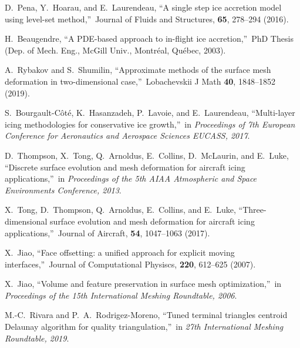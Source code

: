 \documentclass[
11pt,%
tightenlines,%
twoside,%
onecolumn,%
nofloats,%
nobibnotes,%
nofootinbib,%
superscriptaddress,%
noshowpacs,%
centertags]%
{revtex4-2}
\begin{document}
\begin{thebibliography}{99}
D.~Pena, Y.~Hoarau, and E.~Laurendeau, \textquotedblleft A single step ice accretion model using level-set method,\textquotedblright \ Journal of Fluids and Structures, {\bf 65}, 278--294 (2016).



H.~Beaugendre, \textquotedblleft A PDE-based approach to in-flight ice accretion,\textquotedblright \ PhD Thesis (Dep. of Mech. Eng., McGill Univ., Montr\'eal, Qu\'ebec, 2003).

A.~Rybakov and S.~Shumilin, \textquotedblleft Approximate methods of the surface mesh deformation in two-dimensional case,\textquotedblright \ Lobachevskii J Math {\bf 40}, 1848--1852 (2019).

S.~Bourgault-C\^ot\'e, K.~Hasanzadeh, P.~Lavoie, and E.~Laurendeau, \textquotedblleft Multi-layer icing methodologies for conservative ice growth,\textquotedblright \ in \textit{Proceedings of 7th European Conference for Aeronautics and Aerospace Sciences EUCASS, 2017}.

D.~Thompson, X.~Tong, Q.~Arnoldus, E.~Collins, D.~McLaurin, and E.~Luke, \textquotedblleft Discrete surface evolution and mesh deformation for aircraft icing applications,\textquotedblright \ in \textit{Proceedings of the 5th AIAA Atmospheric and Space Environments Conference, 2013}.

X.~Tong, D.~Thompson, Q.~Arnoldus, E.~Collins, and E.~Luke, \textquotedblleft Three-dimensional surface evolution and mesh deformation for aircraft icing applications,\textquotedblright \ Journal of Aircraft, {\bf 54}, 1047--1063 (2017).

X.~Jiao, \textquotedblleft Face offsetting: a unified approach for explicit moving interfaces,\textquotedblright \ Journal of Computational Physiscs, {\bf 220}, 612--625 (2007).

X.~Jiao, \textquotedblleft Volume and feature preservation in surface mesh optimization,\textquotedblright \ in \textit{Proceedings of the 15th International Meshing Roundtable, 2006}.


M.-C.~Rivara and P.~A.~Rodrigez-Moreno, \textquotedblleft Tuned terminal triangles centroid Delaunay algorithm for quality triangulation,\textquotedblright \ in \textit{27th International Meshing Roundtable, 2019}.


\end{thebibliography}
\end{document}

